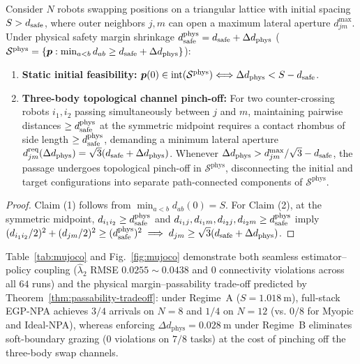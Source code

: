 \begin{theorem}\label{thm:passability-tradeoff}
Consider $N$ robots swapping positions on a triangular lattice with initial spacing $S>d_{\mathrm{safe}}$, where outer neighbors $j,m$ can open a maximum lateral aperture $d_{jm}^{\max}$. Under physical safety margin shrinkage $d_{\mathrm{safe}}^{\mathrm{phys}}=d_{\mathrm{safe}}+\Delta d_{\mathrm{phys}}$ ($\mathcal S^{\mathrm{phys}}=\{\boldsymbol{p}:\min_{a<b}d_{ab}\ge d_{\mathrm{safe}}+\Delta d_{\mathrm{phys}}\}$):
\begin{enumerate}
 \item \textbf{Static initial feasibility:} $\boldsymbol{p}(0)\in\operatorname{int}(\mathcal S^{\mathrm{phys}})\Longleftrightarrow \Delta d_{\mathrm{phys}}<S-d_{\mathrm{safe}}$.
 \item \textbf{Three-body topological channel pinch-off:} For two counter-crossing robots $i_1,i_2$ passing simultaneously between $j$ and $m$, maintaining pairwise distances $\ge d_{\mathrm{safe}}^{\mathrm{phys}}$ at the symmetric midpoint requires a contact rhombus of side length $\ge d_{\mathrm{safe}}^{\mathrm{phys}}$, demanding a minimum lateral aperture $d_{jm}^{\mathrm{req}}(\Delta d_{\mathrm{phys}})=\sqrt{3}(d_{\mathrm{safe}}+\Delta d_{\mathrm{phys}})$. Whenever $\Delta d_{\mathrm{phys}}>d_{jm}^{\max}/\sqrt{3}-d_{\mathrm{safe}}$, the passage undergoes topological pinch-off in $\mathcal S^{\mathrm{phys}}$, disconnecting the initial and target configurations into separate path-connected components of $\mathcal S^{\mathrm{phys}}$.
\end{enumerate}
\end{theorem}
\begin{proof}
Claim (1) follows from $\min_{a<b}d_{ab}(0)=S$. For Claim (2), at the symmetric midpoint, $d_{i_1 i_2}\ge d_{\mathrm{safe}}^{\mathrm{phys}}$ and $d_{i_1 j},d_{i_1 m},d_{i_2 j},d_{i_2 m}\ge d_{\mathrm{safe}}^{\mathrm{phys}}$ imply $(d_{i_1 i_2}/2)^2+(d_{jm}/2)^2\ge(d_{\mathrm{safe}}^{\mathrm{phys}})^2\implies d_{jm}\ge\sqrt{3}(d_{\mathrm{safe}}+\Delta d_{\mathrm{phys}})$.
\end{proof}

Table~\ref{tab:mujoco} and Fig.~\ref{fig:mujoco} demonstrate both seamless estimator--policy coupling ($\hat\lambda_2$ RMSE $0.0255\sim 0.0438$ and $0$ connectivity violations across all $64$ runs) and the physical margin--passability trade-off predicted by Theorem~\ref{thm:passability-tradeoff}: under Regime~A ($S=1.018\ \mathrm m$), full-stack EGP-NPA achieves $3/4$ arrivals on $N=8$ and $1/4$ on $N=12$ (vs. $0/8$ for Myopic and Ideal-NPA), whereas enforcing $\Delta d_{\mathrm{phys}}=0.028\ \mathrm m$ under Regime~B eliminates soft-boundary grazing ($0$ violations on $7/8$ tasks) at the cost of pinching off the three-body swap channels.
